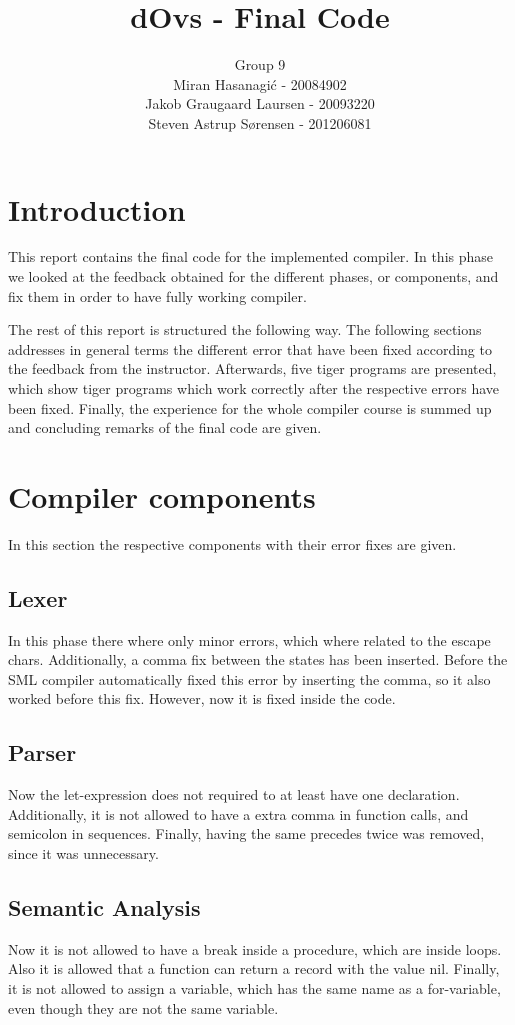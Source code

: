 \documentclass{article}
\title{dOvs - Final Code}
\author{
  Group 9 \\
  Miran Hasanagi\'{c} - 20084902 \\
  Jakob Graugaard Laursen - 20093220\\
  Steven Astrup S\o rensen - 201206081
}
\begin{document}
\maketitle

\section{Introduction}
This report contains the final code for the implemented compiler. In this phase we looked at the feedback obtained for the different phases, or components, and fix them in order to have fully working compiler. 

The rest of this report is structured the following way. The following sections addresses in general terms the different error that have been fixed according to the feedback from the instructor. Afterwards, five tiger programs are presented, which show tiger programs which work correctly after the respective errors have been fixed. Finally, the experience for the whole compiler course is summed up and concluding remarks of the final code are given.


\section{Compiler components}
In this section the respective components with their error fixes are given. 

\subsection{Lexer}
In this phase there where only minor errors, which where related to the escape chars. Additionally, a comma fix between the states has been inserted. Before the SML compiler automatically fixed this error by inserting the comma, so it also worked before this fix. However, now it is fixed inside the code.

\subsection{Parser}
Now the let-expression does not required to at least have one declaration. Additionally, it is not allowed to have a extra comma in function calls, and semicolon in sequences. Finally, having the same precedes twice was removed, since it was unnecessary. 

\subsection{Semantic Analysis}
Now it is not allowed to have a break inside a procedure, which are inside loops. Also it is allowed that a function can return a record with the value nil. Finally, it is not allowed to assign a variable, which has the same name as a for-variable, even though they are not the same variable. 
\end{document}
